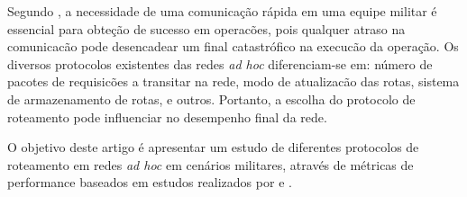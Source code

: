 Segundo \cite{salles}, a necessidade de uma comunica\c{c}\~ao r\'apida em uma equipe militar \'e essencial para obte\c{c}\~ao de sucesso em operac\~oes, pois qualquer atraso na comunicac\~ao pode desencadear um final catastr\'ofico na execuc\~ao da opera\c{c}\~ao. 
Os diversos protocolos existentes das redes \textit{ad hoc} diferenciam-se em: n\'umero de pacotes de requisic\~oes a transitar na rede, modo de atualizac\~ao das rotas, sistema de armazenamento de rotas, e outros. Portanto, a escolha do protocolo de roteamento pode influenciar no desempenho final da rede.

O objetivo deste artigo \'e apresentar um estudo de diferentes protocolos de roteamento em redes \textit{ad hoc} em cen\'arios militares, atrav\'es de m\'etricas de performance baseados em estudos realizados por \cite{pereira} e \cite{salles}.
